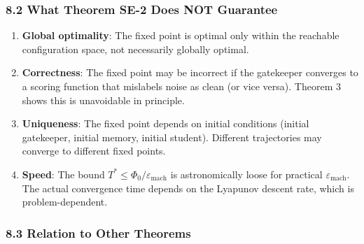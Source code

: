 \documentclass[
  12pt,
]{ctexart}
\providecommand{\tightlist}{%
  \setlength{\itemsep}{0pt}\setlength{\parskip}{0pt}}
\begin{document}
\subsubsection{8.2 What Theorem SE-2 Does NOT
Guarantee}\label{what-theorem-se-2-does-not-guarantee}

\begin{enumerate}
\def\labelenumi{\arabic{enumi}.}
\tightlist
\item
  \textbf{Global optimality}: The fixed point is optimal only within the
  reachable configuration space, not necessarily globally optimal.
\item
  \textbf{Correctness}: The fixed point may be incorrect if the
  gatekeeper converges to a scoring function that mislabels noise as
  clean (or vice versa). Theorem 3 shows this is unavoidable in
  principle.
\item
  \textbf{Uniqueness}: The fixed point depends on initial conditions
  (initial gatekeeper, initial memory, initial student). Different
  trajectories may converge to different fixed points.
\item
  \textbf{Speed}: The bound
  \(T^* \leq \Phi_0/\varepsilon_{\text{mach}}\) is astronomically loose
  for practical \(\varepsilon_{\text{mach}}\). The actual convergence
  time depends on the Lyapunov descent rate, which is problem-dependent.
\end{enumerate}

\subsubsection{8.3 Relation to Other
Theorems}\label{relation-to-other-theorems}
\end{document}
